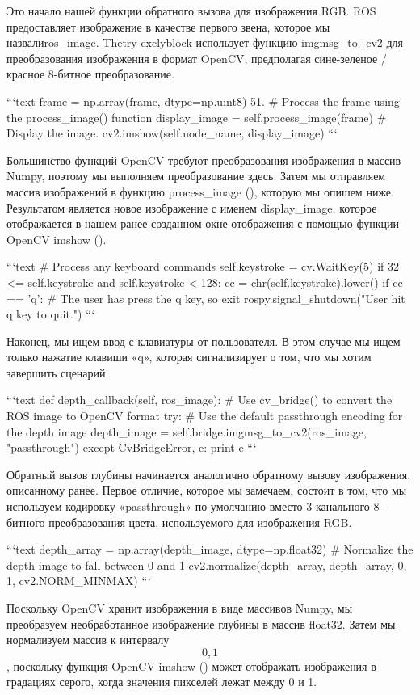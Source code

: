 Это начало нашей функции обратного вызова для изображения RGB. ROS предоставляет изображение в качестве первого звена, которое мы назвалиros\_image. Thetry-exclyblock использует функцию imgmsg\_to\_cv2 для преобразования изображения в формат OpenCV, предполагая сине-зеленое / красное 8-битное преобразование.

```text
frame = np.array(frame, dtype=np.uint8) 51.
# Process the frame using the process_image() function
display_image = self.process_image(frame)
# Display the image.
cv2.imshow(self.node_name, display_image)
```

Большинство функций OpenCV требуют преобразования изображения в массив Numpy, поэтому мы выполняем преобразование здесь. Затем мы отправляем массив изображений в функцию process\_image (), которую мы опишем ниже. Результатом является новое изображение с именем display\_image, которое отображается в нашем ранее созданном окне отображения с помощью функции OpenCV imshow ().

```text
# Process any keyboard commands
self.keystroke = cv.WaitKey(5)
if 32 <= self.keystroke and self.keystroke < 128:
cc = chr(self.keystroke).lower() if cc == 'q':
        # The user has press the q key, so exit
rospy.signal_shutdown("User hit q key to quit.")
```

Наконец, мы ищем ввод с клавиатуры от пользователя. В этом случае мы ищем только нажатие клавиши «q», которая сигнализирует о том, что мы хотим завершить сценарий.

```text
def depth_callback(self, ros_image):
# Use cv_bridge() to convert the ROS image to OpenCV format try:
            # Use the default passthrough encoding for the depth image
depth_image = self.bridge.imgmsg_to_cv2(ros_image, "passthrough")
        except CvBridgeError, e:
            print e
```

Обратный вызов глубины начинается аналогично обратному вызову изображения, описанному ранее. Первое отличие, которое мы замечаем, состоит в том, что мы используем кодировку «passthrough» по умолчанию вместо 3-канального 8-битного преобразования цвета, используемого для изображения RGB.

```text
depth_array = np.array(depth_image, dtype=np.float32)
# Normalize the depth image to fall between 0 and 1
cv2.normalize(depth_array, depth_array, 0, 1, cv2.NORM_MINMAX)
```

Поскольку OpenCV хранит изображения в виде массивов Numpy, мы преобразуем необработанное изображение глубины в массив float32. Затем мы нормализуем массив к интервалу \[0, 1\], поскольку функция OpenCV imshow () может отображать изображения в градациях серого, когда значения пикселей лежат между 0 и 1.

